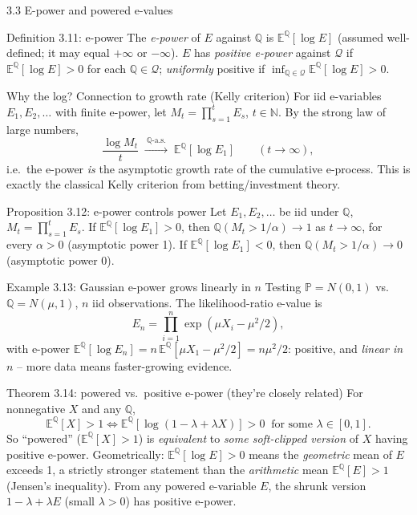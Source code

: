 \documentclass[aspectratio=169,10pt]{beamer}
\newcommand{\PP}{\mathbb{P}}
\newcommand{\QQ}{\mathbb{Q}}
\newcommand{\EE}{\mathbb{E}}
\newcommand{\calQ}{\mathcal{Q}}
\begin{document}
\begin{frame}[allowframebreaks]{3.3 E-power and powered e-values}
  \begin{block}{Definition 3.11: e-power}
    The \emph{e-power} of $E$ against $\QQ$ is $\EE^\QQ[\log E]$ (assumed well-defined; it may equal $+\infty$ or $-\infty$). $E$ has \emph{positive e-power} against $\calQ$ if $\EE^\QQ[\log E]>0$ for each $\QQ\in\calQ$; \emph{uniformly} positive if $\inf_{\QQ\in\calQ}\EE^\QQ[\log E]>0$.
  \end{block}

  \begin{block}{Why the log? Connection to growth rate (Kelly criterion)}
    For iid e-variables $E_1,E_2,\dots$ with finite e-power, let $M_t=\prod_{s=1}^t E_s$, $t\in\mathbb{N}$. By the strong law of large numbers,
    \[
      \frac{\log M_t}{t} \;\xrightarrow{\ \QQ\text{-a.s.}\ }\; \EE^\QQ[\log E_1] \qquad (t\to\infty),
    \]
    i.e.\ the e-power \emph{is} the asymptotic growth rate of the cumulative e-process. This is exactly the classical Kelly criterion from betting/investment theory.
  \end{block}

  \begin{block}{Proposition 3.12: e-power controls power}
    Let $E_1,E_2,\dots$ be iid under $\QQ$, $M_t=\prod_{s=1}^t E_s$. If $\EE^\QQ[\log E_1]>0$, then $\QQ(M_t>1/\alpha)\to 1$ as $t\to\infty$, for every $\alpha>0$ (asymptotic power 1). If $\EE^\QQ[\log E_1]<0$, then $\QQ(M_t>1/\alpha)\to 0$ (asymptotic power 0).
  \end{block}

  \framebreak

  \begin{exampleblock}{Example 3.13: Gaussian e-power grows linearly in $n$}
    Testing $\PP=N(0,1)$ vs.\ $\QQ=N(\mu,1)$, $n$ iid observations. The likelihood-ratio e-value is
    \[
      E_n = \prod_{i=1}^n \exp(\mu X_i - \mu^2/2),
    \]
    with e-power $\EE^\QQ[\log E_n] = n\,\EE^\QQ[\mu X_1-\mu^2/2] = n\mu^2/2$: positive, and \emph{linear in $n$} -- more data means faster-growing evidence.
  \end{exampleblock}

  \begin{block}{Theorem 3.14: powered vs.\ positive e-power (they're closely related)}
    For nonnegative $X$ and any $\QQ$,
    \[
      \EE^\QQ[X]>1 \iff \EE^\QQ[\log(1-\lambda+\lambda X)]>0 \ \text{ for some } \lambda\in[0,1].
    \]
    So ``powered'' ($\EE^\QQ[X]>1$) is \emph{equivalent} to \emph{some soft-clipped version} of $X$ having positive e-power. Geometrically: $\EE^\QQ[\log E]>0$ means the \emph{geometric} mean of $E$ exceeds 1, a strictly stronger statement than the \emph{arithmetic} mean $\EE^\QQ[E]>1$ (Jensen's inequality). From any powered e-variable $E$, the shrunk version $1-\lambda+\lambda E$ (small $\lambda>0$) has positive e-power.
  \end{block}


\end{frame}
\end{document}
